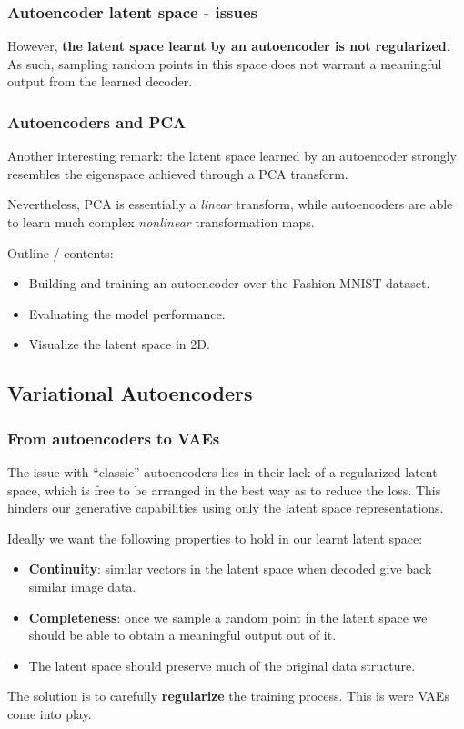 \begin{frame}
    \frametitle{Autoencoder latent space - issues}
    However, \textbf{the latent space learnt by an autoencoder is not regularized}. As such, sampling random points in this space does not warrant a meaningful output from the learned decoder.
\end{frame}

\begin{frame}
    \frametitle{Autoencoders and PCA}
    Another interesting remark: the latent space learned by an autoencoder strongly resembles the eigenspace achieved through a PCA transform.

    Nevertheless, PCA is essentially a \emph{linear} transform, while autoencoders are able to learn much complex \emph{nonlinear} transformation maps.
\end{frame}

\begin{colab}
    Outline / contents:
    \begin{itemize}
        \item Building and training an autoencoder over the Fashion MNIST dataset.
        \item Evaluating the model performance.
        \item Visualize the latent space in 2D.
    \end{itemize}
\end{colab}

\subsection{Variational Autoencoders}

\begin{frame}
    \frametitle{From autoencoders to VAEs}
    The issue with ``classic'' autoencoders lies in their lack of a regularized latent space, which is free to be arranged in the best way as to reduce the loss. This hinders our generative capabilities using only the latent space representations.

    Ideally we want the following properties to hold in our learnt latent space:
    \begin{itemize}
        \item \textbf{Continuity}: similar vectors in the latent space when decoded give back similar image data.
        \item \textbf{Completeness}: once we sample a random point in the latent space we should be able to obtain a meaningful output out of it.
        \item The latent space should preserve much of the original data structure.
    \end{itemize}

    The solution is to carefully \textbf{regularize} the training process. This is were VAEs come into play.
\end{frame}

